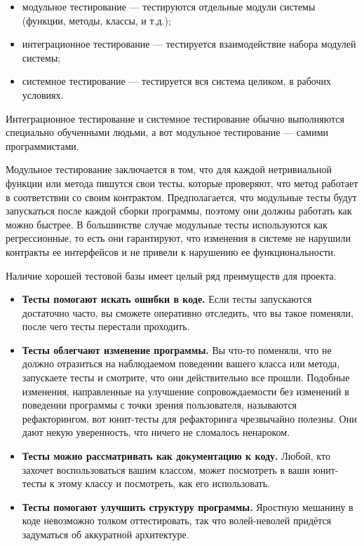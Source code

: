 \documentclass{../../text-style}
\begin{document}
\begin{itemize}
    \item модульное тестирование --- тестируются отдельные модули системы (функции, методы, классы, и т.д.);
    \item интеграционное тестирование --- тестируется взаимодействие набора модулей системы;
    \item системное тестирование --- тестируется вся система целиком, в рабочих условиях.
\end{itemize}

Интеграционное тестирование и системное тестирование обычно выполняются специально обученными людьми, а вот модульное тестирование --- самими программистами.

Модульное тестирование заключается в том, что для каждой нетривиальной функции или метода пишутся свои тесты, которые проверяют, что метод работает в соответствии со своим контрактом. Предполагается, что модульные тесты будут запускаться после каждой сборки программы, поэтому они должны работать как можно быстрее. В большинстве случае модульные тесты используются как регрессионные, то есть они гарантируют, что изменения в системе не нарушили контракты ее интерфейсов и не привели к нарушению ее функциональности.

Наличие хорошей тестовой базы имеет целый ряд преимуществ для проекта.

\begin{itemize}
    \item \textbf{Тесты помогают искать ошибки в коде.} Если тесты запускаются достаточно часто, вы сможете оперативно отследить, что вы такое поменяли, после чего тесты перестали проходить.
    \item \textbf{Тесты облегчают изменение программы.} Вы что-то поменяли, что не должно отразиться на наблюдаемом поведении вашего класса или метода, запускаете тесты и смотрите, что они действительно все прошли. Подобные изменения, направленные на улучшение сопровождаемости без изменений в поведении программы с точки зрения пользователя, называются рефакторингом, вот юнит-тесты для рефакторинга чрезвычайно полезны. Они дают некую уверенность, что ничего не сломалось ненароком.
    \item \textbf{Тесты можно рассматривать как документацию к коду.} Любой, кто захочет воспользоваться вашим классом, может посмотреть в ваши юнит-тесты к этому классу и посмотреть, как его использовать.
    \item \textbf{Тесты помогают улучшить структуру программы.} Яростную мешанину в коде невозможно толком оттестировать, так что волей-неволей придётся задуматься об аккуратной архитектуре.
\end{itemize}
\end{document}
